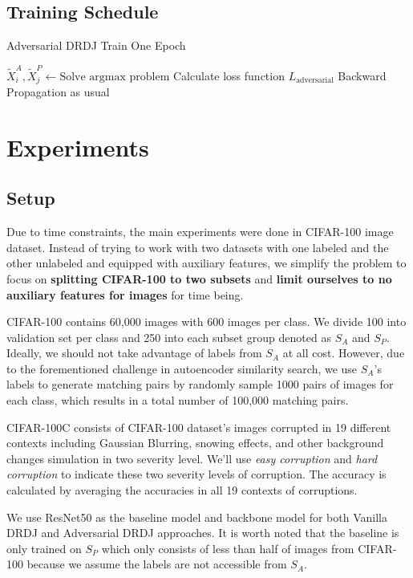 \documentclass{article}
\begin{document}
\subsection{Training Schedule}
\begin{algorithm}
  \caption{Adversarial DRDJ Train One Epoch}
  \begin{algorithmic}[1]
      \State $\tilde{X}_i^A, \tilde{X}_j^P \gets \text{Solve argmax problem}$
      \State Calculate loss function $L_{\text{adversarial}}$
      \State Backward Propagation as usual
    \EndFor
  \end{algorithmic}
\end{algorithm}

\section{Experiments}
\subsection{Setup}
Due to time constraints, the main experiments were done in CIFAR-100 image dataset. 
Instead of trying to work with two datasets with one labeled and the other 
unlabeled and equipped with auxiliary features, we simplify the problem to focus 
on \textbf{splitting CIFAR-100 to two subsets} and \textbf{limit ourselves to no 
auxiliary features for images} for time being. 

CIFAR-100 contains 60,000 images with 600 images per class. We divide 100 into validation 
set per class and 250 into each subset group denoted as $S_A$ and $S_P$. Ideally, we should 
not take advantage of labels from $S_A$ at all cost. However, due to the forementioned 
challenge in autoencoder similarity search, we use $S_A$'s labels to generate matching pairs 
by randomly sample 1000 pairs of images for each class, which results in a total number of 
100,000 matching pairs.

CIFAR-100C \citep{hendrycks2019robustness} consists of CIFAR-100 dataset's images 
corrupted in 19 different contexts including Gaussian Blurring, snowing effects, and 
other background changes simulation in two severity level. We'll use \textit{easy 
corruption} and \textit{hard corruption} to indicate these two severity levels of 
corruption. The accuracy is calculated by averaging the accuracies in all 19 contexts
of corruptions.

We use ResNet50 as the baseline model and backbone model for both Vanilla DRDJ and 
Adversarial DRDJ approaches. It is worth noted that the baseline is only trained on 
$S_P$ which only consists of less than half of images from CIFAR-100 because 
we assume the labels are not accessible from $S_A$. 
\end{document}
